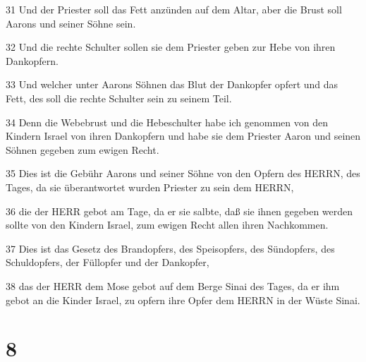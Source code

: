 \par 31 Und der Priester soll das Fett anzünden auf dem Altar, aber die Brust soll Aarons und seiner Söhne sein.
\par 32 Und die rechte Schulter sollen sie dem Priester geben zur Hebe von ihren Dankopfern.
\par 33 Und welcher unter Aarons Söhnen das Blut der Dankopfer opfert und das Fett, des soll die rechte Schulter sein zu seinem Teil.
\par 34 Denn die Webebrust und die Hebeschulter habe ich genommen von den Kindern Israel von ihren Dankopfern und habe sie dem Priester Aaron und seinen Söhnen gegeben zum ewigen Recht.
\par 35 Dies ist die Gebühr Aarons und seiner Söhne von den Opfern des HERRN, des Tages, da sie überantwortet wurden Priester zu sein dem HERRN,
\par 36 die der HERR gebot am Tage, da er sie salbte, daß sie ihnen gegeben werden sollte von den Kindern Israel, zum ewigen Recht allen ihren Nachkommen.
\par 37 Dies ist das Gesetz des Brandopfers, des Speisopfers, des Sündopfers, des Schuldopfers, der Füllopfer und der Dankopfer,
\par 38 das der HERR dem Mose gebot auf dem Berge Sinai des Tages, da er ihm gebot an die Kinder Israel, zu opfern ihre Opfer dem HERRN in der Wüste Sinai.

\chapter{8}

